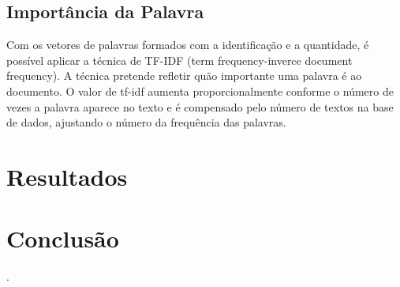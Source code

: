 \documentclass[conference]{IEEEtran}
\begin{document}
\subsection{Importância da Palavra}

Com os vetores de palavras formados com a identificação e a quantidade, é possível aplicar a técnica de TF-IDF (term frequency-inverce document frequency). A técnica pretende refletir quão importante uma palavra é ao documento. O valor de tf-idf aumenta proporcionalmente conforme o número de vezes a palavra aparece no texto e é compensado pelo número de textos na base de dados, ajustando o número da frequência das palavras.

\section{Resultados}

\section{Conclusão}

\cite{IEEEexample:confwithvolume}.



\end{document}
